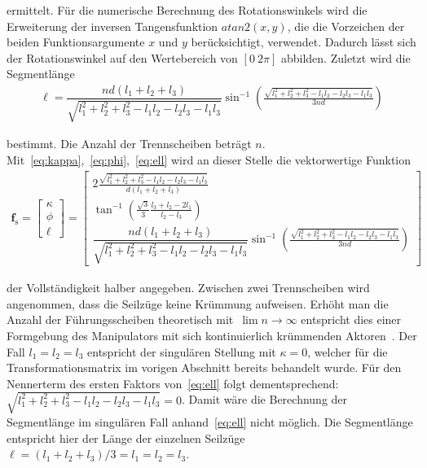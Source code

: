 ermittelt. Für die numerische Berechnung des Rotationswinkels wird die Erweiterung der inversen Tangensfunktion $atan2(x, y)$, die die Vorzeichen der beiden Funktionsargumente $x$ und $y$ berücksichtigt, verwendet. Dadurch lässt sich der Rotationswinkel auf den Wertebereich von $[0~2\pi]$ abbilden. Zuletzt wird die Segmentlänge 
\begin{align}
\ell = \dfrac{nd(l_1+l_2+l_3)}{\sqrt{l_1^2+l_2^2+l_3^2-l_1l_2-l_2l_3-l_1l_3}} 
\sin^{-1}\left( \frac{\sqrt{l_1^2+l_2^2+l_3^2-l_1l_2-l_2l_3-l_1l_3}}{3nd} \right)
\label{eq:ell}
\end{align}

bestimmt. Die Anzahl der Trennscheiben beträgt $n$. Mit~\eqref{eq:kappa},~\eqref{eq:phi},~\eqref{eq:ell} wird an dieser Stelle die vektorwertige Funktion
\begin{align}
\bm{f}_{\mathrm{s}} =
\begin{bmatrix}
\kappa \\ \phi \\ \ell
\end{bmatrix} = 
\begin{bmatrix}
2\frac{\sqrt{l_1^2+l_2^2+l_3^2-l_1l_2-l_2l_3-l_1l_3}}{d(l_1+l_2+l_3)} \\
\tan^{-1}\left(\frac{\sqrt{3}}{3} \frac{l_3+l_2-2l_1}{l_2-l_3} \right) \\
\dfrac{nd(l_1+l_2+l_3)}{\sqrt{l_1^2+l_2^2+l_3^2-l_1l_2-l_2l_3-l_1l_3}} 
\sin^{-1}\left( \frac{\sqrt{l_1^2+l_2^2+l_3^2-l_1l_2-l_2l_3-l_1l_3}}{3nd} \right)
\end{bmatrix}
\label{eq:fspezifisch_vektor}
\end{align}

der Vollständigkeit halber angegeben. Zwischen zwei Trennscheiben wird angenommen, dass die Seilzüge keine Krümmung aufweisen. Erhöht man die Anzahl der Führungsscheiben theoretisch mit~$\lim n\to \infty$ entspricht dies einer Formgebung des Manipulators mit sich kontinuierlich krümmenden Aktoren~\cite{JW06}. Der Fall $l_1=l_2=l_3$ entspricht der singulären Stellung mit $\kappa = 0$, welcher für die Transformationsmatrix im vorigen Abschnitt bereits behandelt wurde. Für den Nennerterm des ersten Faktors von~\eqref{eq:ell} folgt dementsprechend: $\sqrt{l_1^2+l_2^2+l_3^2-l_1l_2-l_2l_3-l_1l_3} = 0$. Damit wäre die Berechnung der Segmentlänge im singulären Fall anhand~\eqref{eq:ell} nicht möglich. Die Segmentlänge entspricht hier der Länge der einzelnen Seilzüge \mbox{$\ell= (l_1+l_2+l_3)/3 = l_1=l_2=l_3$}.

